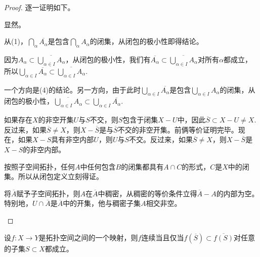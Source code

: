 \begin{proof}
逐一证明如下。
\begin{compactenum}[~~~(1)]
\item 显然。
\item 从(1)，$\bigcap_{\alpha} \overline{A_\alpha}$是包含$\bigcap_{\alpha} A_\alpha$的闭集，从闭包的极小性即得结论。
\item 因为$A_\alpha\subset \overline{\bigcup_{\alpha\in I} A_\alpha}$，从闭包的极小性，我们有$\overline{A_\alpha}\subset \overline{\bigcup_{\alpha\in I} A_\alpha}$对所有$\alpha$都成立，所以$\bigcup_{\alpha\in I} \overline{A_\alpha}\subset \overline{\bigcup_{\alpha\in I} A_\alpha}$.
\item 一个方向是(4)的结论。另一方向，由于此时$\bigcup_{\alpha\in I} \overline{A_\alpha}$是包含$\bigcup_{\alpha\in I} A_\alpha$的闭集，从闭包的极小性，$\overline{\bigcup_{\alpha\in I} A_\alpha}\subset \bigcup_{\alpha\in I} \overline{A_\alpha}$.

\item 如果存在$X$的非空开集$U$与$S$不交，则$S$包含于闭集$X-U$中，因此$\overline{S}\subset X-U\neq X$. 反过来，如果$\overline{S}\neq X$，则$X-\overline{S}$是与$\overline{S}$不交的非空开集。前俩等价证明完毕。现在，如果$X-S$具有非空内部$U$，则$U$与$S$不交。反过来，如果$\overline{S}\neq X$，则$X-\overline{S}$是$X-S$的非空内部。

\item 按照子空间拓扑，任何$A$中任何包含$B$的闭集都具有$A\cap C$的形式，$C$是$X$中的闭集。所以从闭包定义立刻得证。

\item 将$\overline{A}$赋予子空间拓扑，则$A$在$\overline{A}$中稠密，从稠密的等价条件立得$\overline{A}-A$的内部为空。特别地，$U\cap \overline{A}$是$\overline{A}$中的开集，他与稠密子集$A$相交非空。

\end{compactenum}
\end{proof}

\begin{pro}
设$f:X\to Y$是拓扑空间之间的一个映射，则$f$连续当且仅当$f(\overline{S})\subset \overline{f(S)}$对任意的子集$S\subset X$都成立。
\end{pro}

